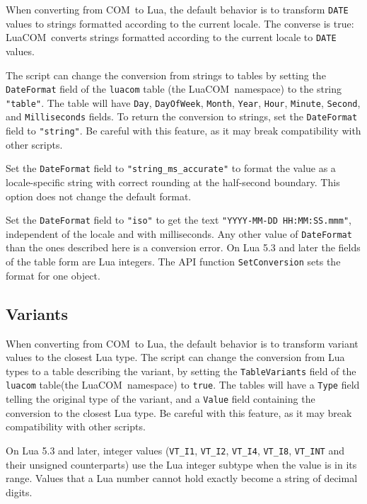 \documentclass[11pt,a4paper,english]{report}
\newcommand{\ident}[1]{\mbox{\texttt{#1}}}
\newcommand{\techname}[1]{\mbox{#1}}
\newcommand{\lua}{\techname{Lua}}
\newcommand{\com}{\techname{COM}}
\newcommand{\luacom}{\techname{LuaCOM}}
\begin{document}
When converting from \com\ to \lua, the default behavior is to transform \ident{DATE}
values to strings formatted according to the current locale. The
converse is true: \luacom\ converts strings formatted according to the
current locale to \ident{DATE} values.

The script can change the conversion from strings to tables by
setting the \verb+DateFormat+ field of the \verb+luacom+ table (the
\luacom\ namespace) to the string \verb+"table"+. The table will
have \verb+Day+, \verb+DayOfWeek+, \verb+Month+, \verb+Year+,
\verb+Hour+, \verb+Minute+, \verb+Second+, and \verb+Milliseconds+
fields. To return the conversion to strings, set the
\verb+DateFormat+ field to \verb+"string"+. Be careful with this
feature, as it may break compatibility with other scripts.

Set the \verb+DateFormat+ field to \verb+"string_ms_accurate"+ to
format the value as a locale-specific string with correct rounding at
the half-second boundary. This option does not change the default format.

Set the \verb+DateFormat+ field to \verb+"iso"+ to get the text
\verb+"YYYY-MM-DD HH:MM:SS.mmm"+, independent of the locale and with
milliseconds. Any other value of \verb+DateFormat+ than the ones
described here is a conversion error. On Lua 5.3 and later the fields
of the table form are Lua integers. The API function
\verb+SetConversion+ sets the format for one object.

\subsection{Variants}

When converting from \com\ to \lua, the default behavior is to
transform variant values to the closest Lua type. The script can
change the conversion from Lua types to a table describing the
variant, by setting the \verb+TableVariants+ field of the
\verb+luacom+ table(the \luacom\ namespace) to \verb+true+. The
tables will have a \verb+Type+ field telling the original type of
the variant, and a \verb+Value+ field containing the conversion to
the closest Lua type. Be careful with this feature, as it may break
compatibility with other scripts.

On Lua 5.3 and later, integer values (\verb+VT_I1+, \verb+VT_I2+,
\verb+VT_I4+, \verb+VT_I8+, \verb+VT_INT+ and their unsigned
counterparts) use the Lua integer subtype when the value is in its
range. Values that a Lua number cannot hold exactly become a string of
decimal digits.
\end{document}
